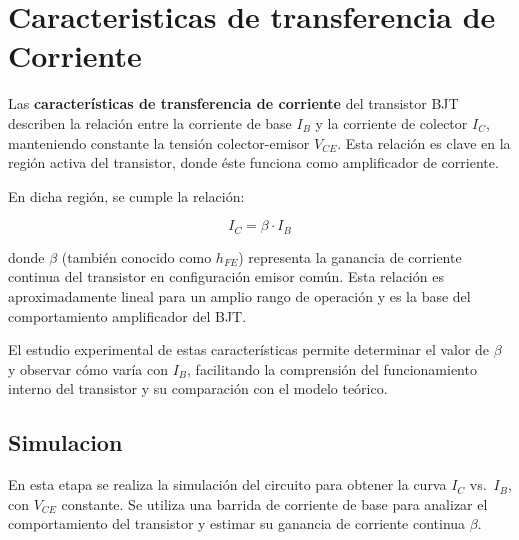 \chapter{Caracteristicas de transferencia de Corriente}
  Las \textbf{características de transferencia de corriente} del transistor BJT describen la relación entre la corriente
  de base $I_B$ y la corriente de colector $I_C$, manteniendo constante la tensión colector-emisor $V_{CE}$. Esta
  relación es clave en la región activa del transistor, donde éste funciona como amplificador de corriente.

  En dicha región, se cumple la relación:

  \begin{equation}
    I_C = \beta \cdot I_B
  \end{equation}

  donde $\beta$ (también conocido como $h_{FE}$) representa la ganancia de corriente continua del transistor en
  configuración emisor común. Esta relación es aproximadamente lineal para un amplio rango de operación y es la base del
  comportamiento amplificador del BJT.
  
  El estudio experimental de estas características permite determinar el valor de $\beta$ y observar cómo varía con
  $I_B$, facilitando la comprensión del funcionamiento interno del transistor y su comparación con el modelo teórico.

  \section{Simulacion}

    En esta etapa se realiza la simulación del circuito para obtener la curva $I_C$ vs.\ $I_B$, con $V_{CE}$ constante.
    Se utiliza una barrida de corriente de base para analizar el comportamiento del transistor y estimar su ganancia de
    corriente continua $\beta$.

